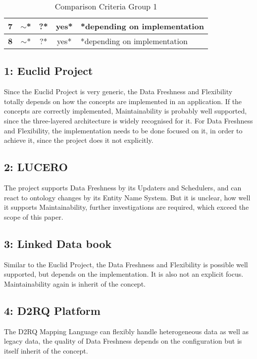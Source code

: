 \begin{table}[htbp]
{\begin{tabular}{|c|c|c|c|l|}
\textbf{7}  & $\sim$*                                                               & ?*                                                                   & yes*                                                              & *depending on implementation     \\ \hline
\textbf{8}  & $\sim$*                                                               & ?*                                                                   & yes*                                                              & *depending on implementation     \\ \hline
\end{tabular}
}
\caption{Comparison Criteria Group 1}
\label{tbl_comp_gr_1}
\end{table}

\subsection*{1: Euclid Project} 
Since the Euclid Project is very generic, the Data Freshness and Flexibility totally depends on how the concepts are implemented in an application. If the concepts are correctly implemented, Maintainability is probably well supported, since the three-layered architecture is widely recognised for it. For Data Freshness and Flexibility, the implementation needs to be done focused on it, in order to achieve it, since the project does it not explicitly.

\subsection*{2: LUCERO}
The project supports Data Freshness by its Updaters and Schedulers, and can react to ontology changes by its Entity Name System. But it is unclear, how well it supports Maintainability, further investigations are required, which exceed the scope of this paper.

\subsection*{3: Linked Data book}
Similar to the Euclid Project, the Data Freshness and Flexibility is possible well supported, but depends on the implementation. It is also not an explicit focus. Maintainability again is inherit of the concept.

\subsection*{4: D2RQ Platform}
The D2RQ Mapping Language can flexibly handle heterogeneous data as well as legacy data, the quality of Data Freshness depends on the configuration but is itself inherit of the concept.


